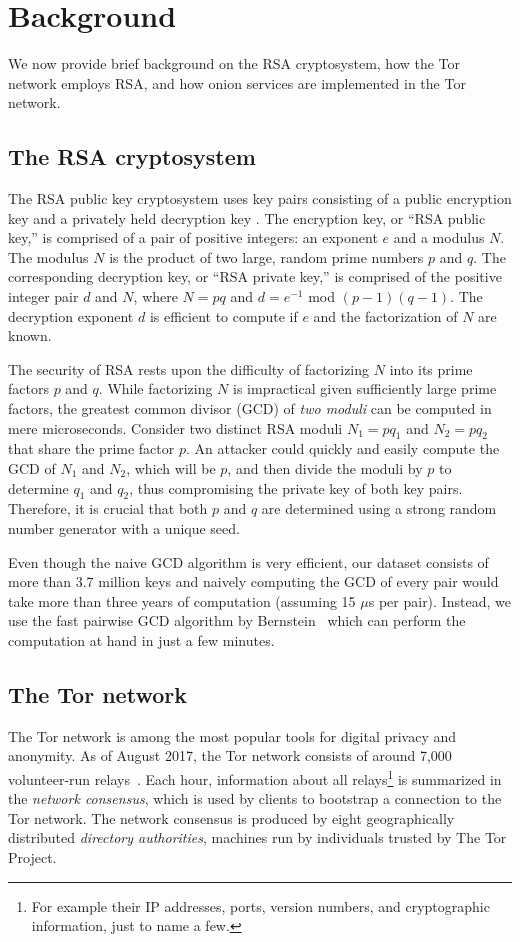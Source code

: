 \section{Background}
\label{sec:background}
We now provide brief background on the RSA cryptosystem, how the Tor
network employs RSA, and how onion services are implemented in the Tor network.

\subsection{The RSA cryptosystem}
The RSA public key cryptosystem uses key pairs consisting of a public encryption
key and a privately held decryption key \cite{Rivest1978a}. The encryption key,
or ``RSA public key,'' is comprised of a pair of positive integers: an exponent
$e$ and a modulus $N$. The modulus $N$ is the product of two large, random prime
numbers $p$ and $q$. The corresponding decryption key, or ``RSA private key,''
is comprised of the positive integer pair $d$ and $N$, where $N = pq$ and $d =
e^{-1}$ mod $(p - 1)(q - 1)$.  The decryption exponent $d$ is efficient to
compute if $e$ and the factorization of $N$ are known.

The security of RSA rests upon the difficulty of factorizing $N$ into its prime
factors $p$ and $q$.  While factorizing $N$ is impractical given sufficiently
large prime factors, the greatest common divisor (GCD) of \emph{two moduli} can
be computed in mere microseconds.  Consider two distinct RSA moduli $N_1 = pq_1$
and $N_2 = pq_2$ that share the prime factor $p$.  An attacker could quickly and
easily compute the GCD of $N_1$ and $N_2$, which will be $p$, and then divide the
moduli by $p$ to determine $q_1$ and $q_2$, thus compromising the private key of
both key pairs.  Therefore, it is crucial that both $p$ and $q$ are determined
using a strong random number generator with a unique seed.

Even though the naive GCD algorithm is very efficient, our dataset consists of
more than 3.7 million keys and naively computing the GCD of every pair would
take more than three years of computation (assuming 15 $\mu$s per pair).
Instead, we use the fast pairwise GCD algorithm by Bernstein~\cite{Bernstein04}
which can perform the computation at hand in just a few minutes.

\subsection{The Tor network}
\label{sec:tor-network}
The Tor network is among the most popular tools for digital privacy and
anonymity. As of August 2017, the Tor network consists of around 7,000
volunteer-run relays~\cite{tormetrics}.  Each hour, information about all
relays\footnote{For example their IP addresses, ports, version numbers, and
cryptographic information, just to name a few.} is summarized in the
\emph{network consensus}, which is used by clients to bootstrap a connection to
the Tor network.  The network consensus is produced by eight geographically
distributed \emph{directory authorities}, machines run by individuals trusted by
The Tor Project.

